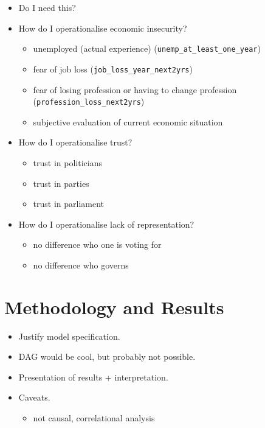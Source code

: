 \documentclass[
]{article}
\providecommand{\tightlist}{%
  \setlength{\itemsep}{0pt}\setlength{\parskip}{0pt}}
\begin{document}
\begin{itemize}
\item
  Do I need this?
\item
  How do I operationalise economic insecurity?

  \begin{itemize}
  \tightlist
  \item
    unemployed (actual experience)
    (\texttt{unemp\_at\_least\_one\_year})
  \item
    fear of job loss (\texttt{job\_loss\_year\_next2yrs})
  \item
    fear of losing profession or having to change profession
    (\texttt{profession\_loss\_next2yrs})
  \item
    subjective evaluation of current economic situation
  \end{itemize}
\item
  How do I operationalise trust?

  \begin{itemize}
  \tightlist
  \item
    trust in politicians
  \item
    trust in parties
  \item
    trust in parliament
  \end{itemize}
\item
  How do I operationalise lack of representation?

  \begin{itemize}
  \tightlist
  \item
    no difference who one is voting for
  \item
    no difference who governs
  \end{itemize}
\end{itemize}

\hypertarget{methodology-and-results}{%
\section{Methodology and Results}\label{methodology-and-results}}

\begin{itemize}
\item
  Justify model specification.
\item
  DAG would be cool, but probably not possible.
\item
  Presentation of results + interpretation.
\item
  Caveats.

  \begin{itemize}
  \tightlist
  \item
    not causal, correlational analysis
  \end{itemize}
\end{itemize}
\end{document}
